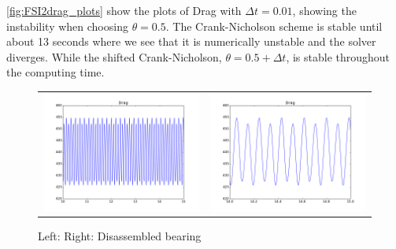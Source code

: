 \ref{fig:FSI2drag_plots} show the plots of Drag with $\Delta t = 0.01$, showing the instability when choosing $\theta = 0.5$. The Crank-Nicholson scheme is stable until about 13 seconds where we see that it is numerically unstable and the solver diverges. While the shifted Crank-Nicholson, $\theta = 0.5 + \Delta t$, is stable throughout the computing time.\newline


\begin{figure}[h]
\begin{tabular}{ll}
\includegraphics[scale=0.4]{./Temporal_stability/FSI3_0001_050_big.png}
&
\includegraphics[scale=0.4]{./Temporal_stability/FSI3_0001_050_small.png}
\end{tabular}
\caption{Left: Right: Disassembled bearing}
\label{Fig:Race}
\end{figure}


